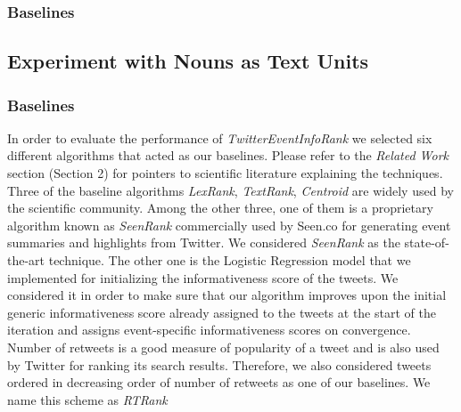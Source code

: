 \subsubsection{Baselines}
\subsection{Experiment with Nouns as Text Units}
\subsubsection{Baselines}
In order to evaluate the performance of \textit{TwitterEventInfoRank} we selected six different algorithms that acted as our baselines. Please refer to the \textit{Related Work} section (Section 2) for pointers to scientific literature explaining the techniques. Three of the baseline algorithms \textit{LexRank}, \textit{TextRank}, \textit{Centroid} are widely used by the scientific community. Among the other three, one of them is a proprietary algorithm known as \textit{SeenRank} commercially used by Seen.co for generating event summaries and highlights from Twitter. We considered \textit{SeenRank} as the state-of-the-art technique. The other one is the Logistic Regression model that we implemented for initializing the informativeness score of the tweets. We considered it in order to make sure that our algorithm improves upon the initial generic informativeness score already assigned to the tweets at the start of the iteration and assigns event-specific informativeness scores on convergence. Number of retweets is a good measure of popularity of a tweet and is also used by Twitter for ranking its search results. Therefore, we also considered tweets ordered in decreasing order of number of retweets as one of our baselines. We name this scheme as \textit{RTRank}

